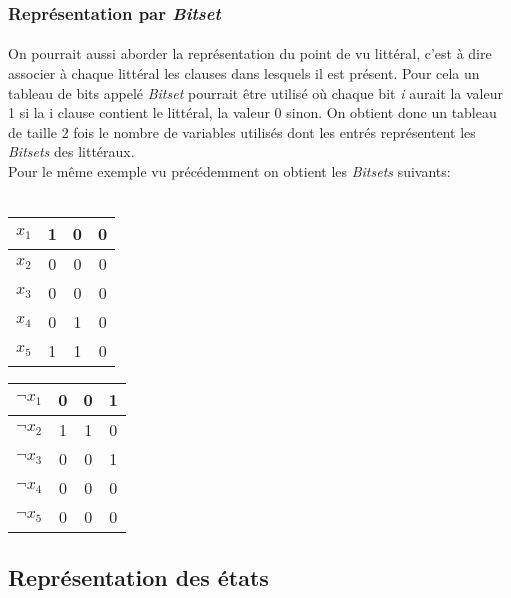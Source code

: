 \subsubsection{Représentation par \textit{Bitset}}
\paragraph{}
On pourrait aussi aborder la représentation du point de vu littéral, c’est à dire associer à chaque littéral les clauses dans lesquels il est présent. Pour cela un tableau de bits appelé \textit{Bitset} pourrait être utilisé où chaque bit \textit{i} aurait la valeur 1 si la i clause contient le littéral, la valeur 0 sinon. On obtient donc un tableau de taille 2 fois le nombre de variables utilisés dont les entrés représentent les \textit{Bitsets} des littéraux.\\
Pour le même exemple vu précédemment on obtient les \textit{Bitsets} suivants:\\\\
	\begin{minipage}{0.5\textwidth}
		\centering
		\begin{tabular}{|c | c| c| c|}
			\hline
			$x_{1}$& 1 & 0 & 0 \\\hline
			$x_{2}$& 0 & 0 & 0 \\\hline
			$x_{3}$& 0 & 0 & 0 \\\hline
			$x_{4}$& 0 & 1 & 0 \\\hline
			$x_{5}$& 1 & 1 & 0 \\\hline
		\end{tabular}
	\end{minipage}
	\hfillx
	\begin{minipage}{0.5\textwidth}
		\centering
		\begin{tabular}{|c | c| c| c|}
			\hline
			$\neg x_{1}$& 0 & 0 & 1 \\\hline
			$\neg x_{2}$& 1 & 1 & 0 \\\hline
			$\neg x_{3}$& 0 & 0 & 1 \\\hline
			$\neg x_{4}$& 0 & 0 & 0 \\\hline
			$\neg x_{5}$& 0 & 0 & 0 \\\hline
		\end{tabular}
	\end{minipage}

\subsection{Représentation des états}
